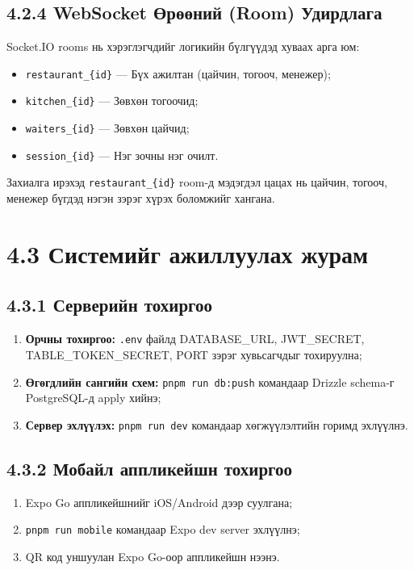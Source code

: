 \subsection{4.2.4 WebSocket Өрөөний (Room) Удирдлага}

Socket.IO rooms нь хэрэглэгчдийг логикийн бүлгүүдэд хуваах арга юм:

\begin{itemize}
    \item \texttt{restaurant\_\{id\}} — Бүх ажилтан (цайчин, тогооч, менежер);
    \item \texttt{kitchen\_\{id\}} — Зөвхөн тогоочид;
    \item \texttt{waiters\_\{id\}} — Зөвхөн цайчид;
    \item \texttt{session\_\{id\}} — Нэг зочны нэг очилт.
\end{itemize}

Захиалга ирэхэд \texttt{restaurant\_\{id\}} room-д мэдэгдэл цацах нь цайчин,
тогооч, менежер бүгдэд нэгэн зэрэг хүрэх боломжийг хангана.

\section{4.3 Системийг ажиллуулах журам}

\subsection{4.3.1 Серверийн тохиргоо}

\begin{enumerate}
    \item \textbf{Орчны тохиргоо:} \texttt{.env} файлд DATABASE\_URL, JWT\_SECRET,
          TABLE\_TOKEN\_SECRET, PORT зэрэг хувьсагчдыг тохируулна;
    \item \textbf{Өгөгдлийн сангийн схем:} \texttt{pnpm run db:push} командаар
          Drizzle schema-г PostgreSQL-д apply хийнэ;
    \item \textbf{Сервер эхлүүлэх:} \texttt{pnpm run dev} командаар хөгжүүлэлтийн
          горимд эхлүүлнэ.
\end{enumerate}

\subsection{4.3.2 Мобайл аппликейшн тохиргоо}

\begin{enumerate}
    \item Expo Go аппликейшнийг iOS/Android дээр суулгана;
    \item \texttt{pnpm run mobile} командаар Expo dev server эхлүүлнэ;
    \item QR код уншуулан Expo Go-оор аппликейшн нээнэ.
\end{enumerate}

